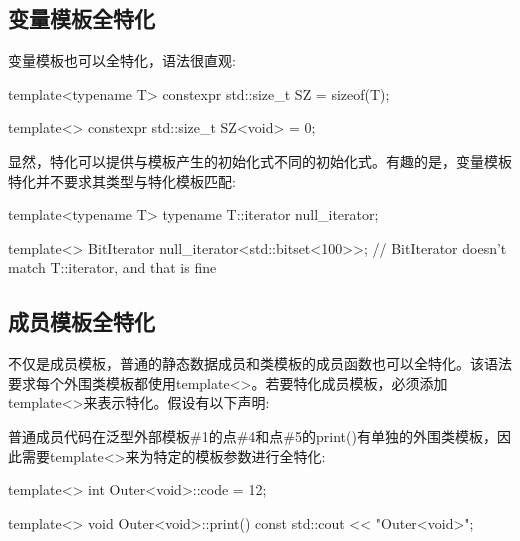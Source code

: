 \subsection{变量模板全特化}

变量模板也可以全特化，语法很直观:

\begin{cpp}
template<typename T> constexpr std::size_t SZ = sizeof(T);

template<> constexpr std::size_t SZ<void> = 0;
\end{cpp}

显然，特化可以提供与模板产生的初始化式不同的初始化式。有趣的是，变量模板特化并不要求其类型与特化模板匹配:

\begin{cpp}
template<typename T> typename T::iterator null_iterator;

template<> BitIterator null_iterator<std::bitset<100>>;
// BitIterator doesn’t match T::iterator, and that is fine
\end{cpp}

\subsection{成员模板全特化}

不仅是成员模板，普通的静态数据成员和类模板的成员函数也可以全特化。该语法要求每个外围类模板都使用template<>。若要特化成员模板，必须添加template<>来表示特化。假设有以下声明:


普通成员代码在泛型外部模板\#1的点\#4和点\#5的print()有单独的外围类模板，因此需要template<>来为特定的模板参数进行全特化:

\begin{cpp}
template<>
int Outer<void>::code = 12;

template<>
void Outer<void>::print() const
{
	std::cout << "Outer<void>";
}
\end{cpp}

